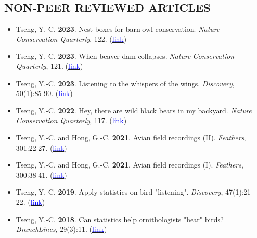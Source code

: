 \documentclass[11pt,letterpaper,sans]{moderncv}        %
\begin{document}
\subsection{NON-PEER REVIEWED ARTICLES}
\begin{itemize}

\item{Tseng, Y.-C. \textbf{2023}. Nest boxes for barn owl conservation. \textit{Nature Conservation Quarterly}}, 122. (\href{https://github.com/SunnyTseng/sunny_website/blob/main/assets/media/documents/2023-07-03_1336134904.pdf}{\textcolor{blue}{link}})
\vspace{3pt}

\item{Tseng, Y.-C. \textbf{2023}. When beaver dam collapses. \textit{Nature Conservation Quarterly}}, 121. (\href{https://github.com/SunnyTseng/sunny_website/blob/main/assets/media/documents/2023-04-17_0744599592.pdf}{\textcolor{blue}{link}})
\vspace{3pt}

\item{Tseng, Y.-C. \textbf{2023}. Listening to the whispers of the wings. \textit{Discovery}}, 50(1):85-90. (\href{https://drive.google.com/file/d/1dJVMvOMULfuDzc_YATCUpOdxOxK6YwaX/view?usp=share_link}{\textcolor{blue}{link}})
\vspace{3pt}


\item{Tseng, Y.-C. \textbf{2022}. Hey, there are wild black bears in my backyard. \textit{Nature Conservation Quarterly}}, 117. (\href{https://github.com/SunnyTseng/sunny_website/blob/main/assets/media/documents/2022-03-31_1337080532.pdf}{\textcolor{blue}{link}})
\vspace{3pt}

\item{Tseng, Y.-C. and Hong, G.-C. \textbf{2021}. Avian field recordings (II). \textit{Feathers}}, 301:22-27. (\href{https://www.bird.org.tw/feather}{\textcolor{blue}{link}})
\vspace{3pt}

\item{Tseng, Y.-C. and Hong, G.-C. \textbf{2021}. Avian field recordings (I). \textit{Feathers}}, 300:38-41. (\href{https://www.bird.org.tw/feather}{\textcolor{blue}{link}})
\vspace{3pt}

\item{Tseng, Y.-C. \textbf{2019}. Apply statistics on bird "listening". \textit{Discovery}}, 47(1):21-22. (\href{https://drive.google.com/open?id=1lZC8H246lFH-XCGI6vtBjXMIq1YqukUG}{\textcolor{blue}{link}})
\vspace{3pt}

\item{Tseng, Y.-C. \textbf{2018}. Can statistics help ornithologists "hear" birds? \textit{BranchLines}}, 29(3):11. (\href{https://forestry.ubc.ca/files/2019/04/bl-29.3.pdf#page=11}{\textcolor{blue}{link}}) 
\vspace{3pt}

\end{itemize}
\end{document}
